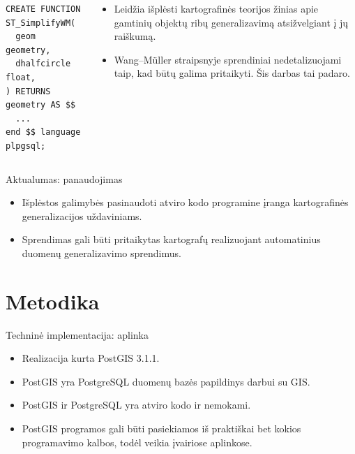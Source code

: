 \documentclass[14pt]{beamer}
\newcommand{\WM}{Wang--M{\"u}ller}
\begin{document}
\begin{frame}[fragile] %
  \begin{columns}[c]
    \begin{column}{.3\textwidth}
      \begin{verbatim}
CREATE FUNCTION ST_SimplifyWM(
  geom geometry,
  dhalfcircle float,
) RETURNS geometry AS $$
  ...
end $$ language plpgsql;
      \end{verbatim}
    \end{column}
    \begin{column}{.7\textwidth}
      \begin{itemize}
        \item Leidžia išplėsti kartografinės teorijos žinias apie gamtinių
          objektų ribų generalizavimą atsižvelgiant į jų raiškumą.
        \item {\WM} straipsnyje sprendiniai nedetalizuojami taip, kad būtų
          galima pritaikyti. Šis darbas tai padaro.
      \end{itemize}
    \end{column}
  \end{columns}
\end{frame}

\begin{frame}{Aktualumas: panaudojimas}
    \begin{itemize}
        \item Išplėstos galimybės pasinaudoti atviro
            kodo programine įranga kartografinės generalizacijos
            uždaviniams.
        \item Sprendimas gali būti pritaikytas kartografų realizuojant
            automatinius duomenų generalizavimo sprendimus.
    \end{itemize}
\end{frame}


\section{Metodika}

\begin{frame}{Techninė implementacija: aplinka}
    \begin{itemize}[<+->]
        \item Realizacija kurta PostGIS 3.1.1.

        \item PostGIS yra PostgreSQL duomenų bazės papildinys darbui su GIS.

        \item PostGIS ir PostgreSQL yra atviro kodo ir nemokami.
            
        \item PostGIS programos gali būti pasiekiamos iš praktiškai bet kokios
            programavimo kalbos, todėl veikia įvairiose aplinkose.

    \end{itemize}
\end{frame}
\end{document}

